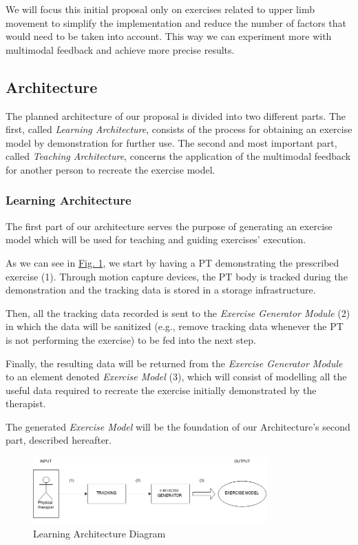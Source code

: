 \documentclass[runningheads]{llncs}
\begin{document}
We will focus this initial proposal only on exercises related to upper limb movement to simplify the implementation and reduce the number of factors that would need to be taken into account. This way we can experiment more with multimodal feedback and achieve more precise results.


\subsection{Architecture}
\label{section-approach-architecture}

The planned architecture of our proposal is divided into two different parts. 
The first, called \emph{Learning Architecture}, consists of the process for obtaining an exercise model by demonstration for further use.
The second and most important part, called \emph{Teaching Architecture}, concerns the application of the multimodal feedback for another person to recreate the exercise model.


\subsubsection{Learning Architecture}

The first part of our architecture serves the purpose of generating an exercise model which will be used for teaching and guiding exercises' execution.

As we can see in \hyperref[fig:learning]{Fig. \ref{fig:learning}}, we start by having a \ac{PT} demonstrating the prescribed exercise (1). Through motion capture devices, the \ac{PT} body is tracked during the demonstration and the tracking data is stored in a storage infrastructure.

Then, all the tracking data recorded is sent to the \emph{Exercise Generator Module} (2) in which the data will be sanitized (e.g., remove tracking data whenever the \ac{PT} is not performing the exercise) to be fed into the next step.

Finally, the resulting data will be returned from the \emph{Exercise Generator Module} to an element denoted \emph{Exercise Model} (3), which will consist of modelling all the useful data required to recreate the exercise initially demonstrated by the therapist. 

The generated \emph{Exercise Model} will be the foundation of our Architecture's second part, described hereafter.


\begin{figure}
	\centering
	\includegraphics[width=0.8\textwidth]{imgs/LearningPhase}
	\caption{Learning Architecture Diagram}
	\label{fig:learning}
\end{figure}
\end{document}
